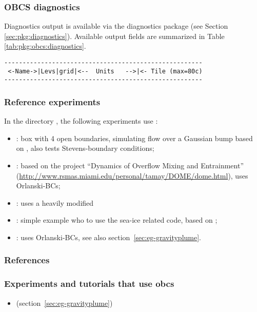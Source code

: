 \subsubsection{OBCS diagnostics
\label{sec:pkg:obcs:diagnostics}}

Diagnostics output is available via the diagnostics package
(see Section \ref{sec:pkg:diagnostics}).
Available output fields are summarized in 
Table \ref{tab:pkg:obcs:diagnostics}.

\begin{table}[!ht]
\centering
\label{tab:pkg:obcs:diagnostics}
{\footnotesize
\begin{verbatim}
------------------------------------------------------
 <-Name->|Levs|grid|<--  Units   -->|<- Tile (max=80c)
------------------------------------------------------

\end{verbatim}
}
\caption{~}
\end{table}


\subsubsection{Reference experiments}
In the directory , the following experiments use
: 
\begin{itemize}
\item {}: box with 4 open boundaries, simulating flow over a
  Gaussian bump based on \citet{adcroft:97}, also tests
  Stevens-boundary conditions;
\item {}: based on the project ``Dynamics of Overflow Mixing
  and Entrainment''
  (\url{http://www.rsmas.miami.edu/personal/tamay/DOME/dome.html}), uses
  Orlanski-BCs;
\item {}: uses a heavily modified 
\item {}: simple example who to use the sea-ice
  related code, based on ;
\item {}: uses Orlanski-BCs, see also
  section~\ref{sec:eg-gravityplume}.
\end{itemize}




\subsubsection{References}

\subsubsection{Experiments and tutorials that use obcs}
\label{sec:pkg:obcs:experiments}

\begin{itemize}
\item {} (section~\ref{sec:eg-gravityplume})
\end{itemize}



